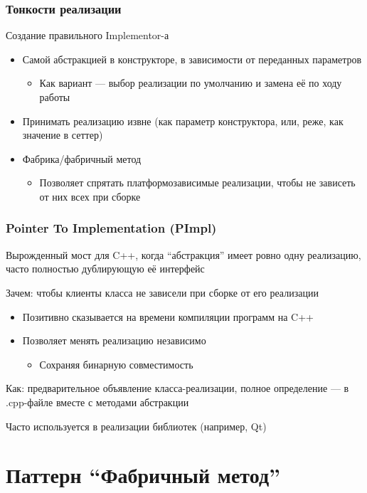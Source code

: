 \documentclass[xetex,mathserif,serif]{beamer}
\begin{document}
	\begin{frame}
		\frametitle{Тонкости реализации}
		Создание правильного Implementor-а
		\begin{itemize}
			\item Самой абстракцией в конструкторе, в зависимости от переданных параметров
			\begin{itemize}
				\item Как вариант --- выбор реализации по умолчанию и замена её по ходу работы
			\end{itemize}
			\item Принимать реализацию извне (как параметр конструктора, или, реже, как значение в сеттер)
			\item Фабрика/фабричный метод
			\begin{itemize}
				\item Позволяет спрятать платформозависимые реализации, чтобы не зависеть от них всех при сборке
			\end{itemize}
		\end{itemize}
	\end{frame}

	\begin{frame}
		\frametitle{Pointer To Implementation (PImpl)}
		Вырожденный мост для C++, когда ``абстракция'' имеет ровно одну реализацию, часто полностью дублирующую её интерфейс

		Зачем: чтобы клиенты класса не зависели при сборке от его реализации

		\begin{itemize}
			\item Позитивно сказывается на времени компиляции программ на C++
			\item Позволяет менять реализацию независимо
			\begin{itemize}
				\item Сохраняя бинарную совместимость
			\end{itemize}
		\end{itemize}

		Как: предварительное объявление класса-реализации, полное определение --- в .cpp-файле вместе с методами абстракции

		Часто используется в реализации библиотек (например, Qt)
	\end{frame}

	\section{Паттерн ``Фабричный метод''}
\end{document}
